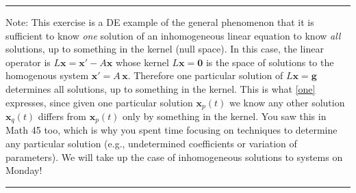 \documentclass[11pt,letterpaper,boxed]{pset}
\begin{document}
    \bigskip  
    \hrule
    \bigskip
    \noindent Note: This exercise is a DE example of the general phenomenon that it is sufficient to know \textit{one} solution of an inhomogeneous linear equation to know \textit{all} solutions, up to something in the kernel (null space). In this case, the linear operator is $L\mathbf{x} = \mathbf{x}' - A\mathbf{x}$ whose kernel  $L\mathbf{x} = \mathbf{0}$ is the space of solutions to the homogenous system $\mathbf{x} ' = A \, \mathbf{x}$. Therefore one particular solution of $L\mathbf{x} = \mathbf{g}$ determines all solutions, up to something in the kernel. This  is what \eqref{one} expresses, since given one particular solution $\mathbf{x}_p(t)$ we know any other solution $\mathbf{x}_q(t)$ differs from $\mathbf{x}_p(t)$ only by something in the kernel. You saw this in Math 45 too, which is why you spent time focusing on techniques to determine any particular solution (e.g., undetermined coefficients or variation of parameters). We will take up the case of inhomogeneous solutions to systems on Monday!
    \bigskip
    \hrule
\end{document}

